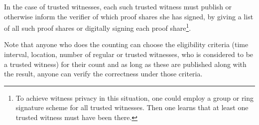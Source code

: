 In the case of trusted witnesses, each such trusted witness must
publish or otherwise inform the 
verifier of which proof shares she has signed, \eg by giving a list 
of all such proof shares or digitally signing each proof share\footnote{
 To achieve witness privacy in this situation, one could employ a group or 
 ring signature scheme for all trusted witnesses.
 Then one learns that at least one trusted witness must have been there.
}.

Note that anyone who does the counting can choose the eligibility
criteria (time interval, location, number of regular or trusted
witnesses, who is considered to be a trusted witness) for their count
and as long as these are published along with the result, anyone can
verify the correctness under those criteria.

